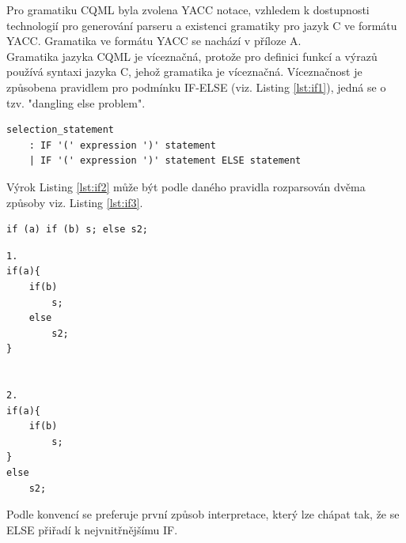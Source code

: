 \documentclass[report,11pt]{elsarticle}
\begin{document}
Pro gramatiku CQML byla zvolena YACC notace, vzhledem k dostupnosti technologií pro generování parseru a existenci gramatiky pro jazyk C ve formátu YACC. Gramatika ve formátu YACC se nachází v příloze A.\\
Gramatika jazyka CQML je víceznačná, protože pro definici funkcí a výrazů používá syntaxi jazyka C, jehož gramatika je víceznačná. Víceznačnost je způsobena pravidlem pro podmínku IF-ELSE (viz. Listing \ref{lst:if1}), jedná se o tzv. "dangling else problem".\\
\begin{lstlisting}[frame=single,caption=Víceznačné IF-ELSE pravidlo gramatiky.,label=lst:if1]
selection_statement
	: IF '(' expression ')' statement
	| IF '(' expression ')' statement ELSE statement 
\end{lstlisting}
Výrok Listing \ref{lst:if2} může být podle daného pravidla rozparsován dvěma způsoby viz. Listing \ref{lst:if3}.
\begin{lstlisting}[frame=single,caption=Příklad víceznačného výroku IF-ELSE,label=lst:if2]
if (a) if (b) s; else s2;
\end{lstlisting}

\begin{lstlisting}[frame=single,caption=Možnosti interpretace víceznačného výroku IF-ELSE,label=lst:if3]
1.
if(a){
	if(b)
		s;
	else
		s2;
}


2.
if(a){
	if(b)
		s;
}
else
	s2;
\end{lstlisting}
Podle konvencí se preferuje první způsob interpretace, který lze chápat tak, že se ELSE přiřadí k nejvnitřnějšímu IF.
\end{document}
